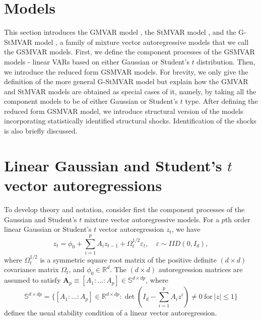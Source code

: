\documentclass[nojss]{jss} %
\begin{document}
\section{Models}\label{sec:models}
This section introduces the GMVAR model \citep{Kalliovirta+Meitz+Saikkonen:2016}, the StMVAR model \citep{Virolainen2:2021}, and the G-StMVAR model \citep{Virolainen2:2021}, a family of mixture vector autoregressive models that we call the GSMVAR models. First, we define the component processes of the GSMVAR models - linear VARs based on either Gaussian or Student's $t$ distribution. Then, we introduce the reduced form GSMVAR models. For brevity, we only give the definition of the more general G-StMVAR model but explain how the GMVAR and StMVAR models are obtained as special cases of it, namely, by taking all the component models to be of either Gaussian or Student's $t$ type. After defining the reduced form GSMVAR model, we introduce structural version of the models incorporating statistically identified structural shocks. Identification of the shocks is also briefly discussed.

\section{Linear Gaussian and Student's $t$ vector autoregressions}
To develop theory and notation, consider first the component processes of the Gaussian and Student's $t$ mixture vector autoregressive models. For a $p$th order linear Gaussian or Student's $t$ vector autoregression $z_t$, we have
\begin{equation}\label{eq:gaussianvar}
z_t = \phi_{0} + \sum_{i=1}^pA_iz_{t-1} + \Omega_t^{1/2}\varepsilon_t, \quad \varepsilon\sim IID(0,I_d),
\end{equation}
where $\Omega_t^{1/2}$ is a symmetric square root matrix of the positive definite $(d\times d)$ covariance matrix $\Omega_t$, and $\phi_0\in\mathbb{R}^d$. The $(d \times d)$ autoregression matrices are assumed to satisfy $\boldsymbol{A}_p \equiv [A_1:...:A_p]\in\mathbb{S}^{d\times dp}$, where
\begin{equation}\label{eq:statreg}
\mathbb{S}^{d\times dp}= \lbrace [A_1:...:A_p]\in\mathbb{R}^{d\times dp}: \det(I_d - \sum_{i=1}^pA_iz^i)\neq 0 \ \text{for} \ |z|\leq 1 \rbrace
\end{equation}
defines the usual stability condition of a linear vector autoregression.
\end{document}
